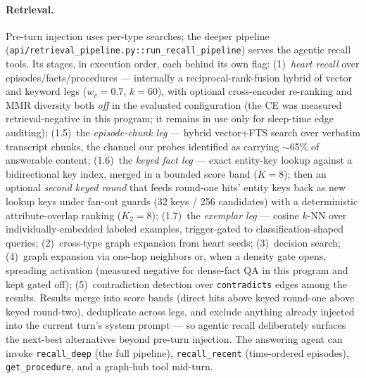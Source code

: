 \documentclass{article}
\begin{document}
\paragraph{Retrieval.}
Pre-turn injection uses per-type searches; the deeper pipeline
(\texttt{api/retrieval\_pipeline.py::run\_recall\_pipeline}) serves the
agentic recall tools. Its stages, in execution order, each behind its own
flag: (1)~\emph{heart recall} over episodes/facts/procedures --- internally a
reciprocal-rank-fusion hybrid of vector and keyword legs
($w_v{=}0.7$, $k{=}60$), with optional cross-encoder re-ranking and MMR
diversity both \emph{off} in the evaluated configuration (the CE was
measured retrieval-negative in this program; it remains in use only for
sleep-time edge auditing); (1.5)~the \emph{episode-chunk leg} --- hybrid
vector+FTS search over verbatim transcript chunks, the channel our probes
identified as carrying $\sim$65\% of answerable content; (1.6)~the
\emph{keyed fact leg} --- exact entity-key lookup against a
bidirectional key index, merged in a bounded score band ($K{=}8$);
then an optional \emph{second keyed round} that feeds round-one hits'
entity keys back as new lookup keys under fan-out guards (32 keys / 256
candidates) with a deterministic attribute-overlap ranking ($K_2{=}8$);
(1.7)~the \emph{exemplar leg} --- cosine $k$-NN over
individually-embedded labeled examples, trigger-gated to
classification-shaped queries; (2)~cross-type graph expansion from heart
seeds; (3)~decision search; (4)~graph expansion via one-hop neighbors or,
when a density gate opens, spreading activation (measured negative for
dense-fact QA in this program and kept gated off); (5)~contradiction
detection over \texttt{contradicts} edges among the results. Results merge
into score bands (direct hits above keyed round-one above keyed round-two),
deduplicate across legs, and exclude anything already injected into the
current turn's system prompt --- so agentic recall deliberately surfaces the
next-best alternatives beyond pre-turn injection. The answering agent can
invoke \texttt{recall\_deep} (the full pipeline), \texttt{recall\_recent}
(time-ordered episodes), \texttt{get\_procedure}, and a graph-hub tool
mid-turn.
\end{document}
